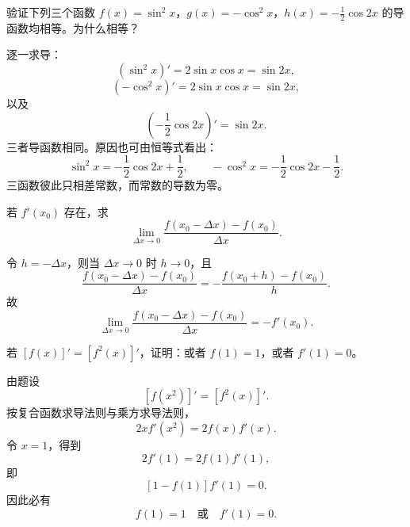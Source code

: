 \begin{xthought}[4]
验证下列三个函数 $f(x)=\sin^2x$，$g(x)=-\cos^2x$，$h(x)=-\frac12\cos2x$ 的导函数均相等。为什么相等？
\end{xthought}
\begin{xsolution}
逐一求导：
\[
  (\sin^2x)'=2\sin x\cos x=\sin2x,
\]
\[
  (-\cos^2x)'=2\sin x\cos x=\sin2x,
\]
以及
\[
  \left(-\frac12\cos2x\right)'=\sin2x.
\]
三者导函数相同。原因也可由恒等式看出：
\[
  \sin^2x=-\frac12\cos2x+\frac12,
  \qquad
  -\cos^2x=-\frac12\cos2x-\frac12.
\]
三函数彼此只相差常数，而常数的导数为零。
\end{xsolution}


\begin{xthought}[5]
若 $f'(x_0)$ 存在，求
  \[
    \lim_{\Delta x\to0}\frac{f(x_0-\Delta x)-f(x_0)}{\Delta x}.
  \]
\end{xthought}
\begin{xsolution}
令 $h=-\Delta x$，则当 $\Delta x\to0$ 时 $h\to0$，且
\[
  \frac{f(x_0-\Delta x)-f(x_0)}{\Delta x}
  =-\frac{f(x_0+h)-f(x_0)}h.
\]
故
\[
  \lim_{\Delta x\to0}\frac{f(x_0-\Delta x)-f(x_0)}{\Delta x}
  =-f'(x_0).
\]
\end{xsolution}


\begin{xthought}[6]
若 $[f(x)]'=[f^2(x)]'$，证明：或者 $f(1)=1$，或者 $f'(1)=0$。
\end{xthought}
\begin{xsolution}
由题设
\[
  [f(x^2)]'=[f^2(x)]'.
\]
按复合函数求导法则与乘方求导法则，
\[
  2x f'(x^2)=2f(x)f'(x).
\]
令 $x=1$，得到
\[
  2f'(1)=2f(1)f'(1),
\]
即
\[
  [1-f(1)]f'(1)=0.
\]
因此必有
\[
  \boxed{f(1)=1\quad\text{或}\quad f'(1)=0}.
\]
\end{xsolution}


